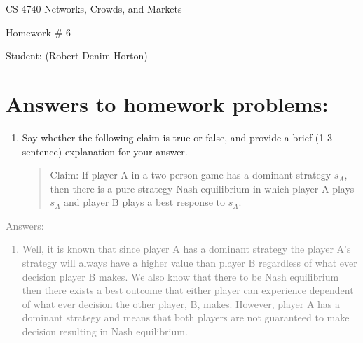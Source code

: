 \documentclass[11pt]{article}
\begin{document}
 

\rhead{\today}

\begin{center}\begin{Large}
CS 4740 Networks, Crowds, and Markets 

Homework \# 6

Student: (Robert Denim Horton)
\end{Large}
\end{center}

\section*{Answers to homework problems:}

\begin{enumerate}
	\item Say whether the following claim is true or false, and provide a brief (1-3 sentence) explanation for your answer. \\
	\begin{quote}
		 Claim: If player A in a two-person game has a dominant strategy $s_A$, then there is a pure strategy Nash equilibrium in which player A plays $s_A$ and player B plays a best response to $s_A$. 
	\end{quote}
\end{enumerate}
\textcolor{gray}{
Answers:
\begin{enumerate}
	\item Well, it is known that since player A has a dominant strategy the player A's strategy will always have a higher value than player B regardless of what ever decision player B makes.  We also know that there to be Nash equilibrium then there exists a best outcome that either player can experience dependent of what ever decision the other player, B,  makes. However,  player A has a dominant strategy and means that both players are not guaranteed to make decision resulting in Nash equilibrium.   
\end{enumerate}
}
\end{document}
